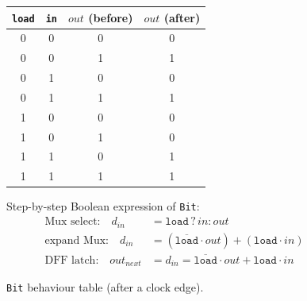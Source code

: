 \documentclass[11pt]{article}
\begin{document}
\begin{figure}[H]
  \centering
  \begin{minipage}[t]{0.46\linewidth}
    \centering
    \small
    \begin{tabular}[t]{@{}cc c c@{}}
    \toprule
    \texttt{load} & \texttt{in} & $out$ (before) & $out$ (after) \\
    \midrule
    0 & 0 & 0 & 0 \\
    0 & 0 & 1 & 1 \\
    0 & 1 & 0 & 0 \\
    0 & 1 & 1 & 1 \\
    1 & 0 & 0 & 0 \\
    1 & 0 & 1 & 0 \\
    1 & 1 & 0 & 1 \\
    1 & 1 & 1 & 1 \\
    \bottomrule
    \end{tabular}
    \caption{\texttt{Bit} behaviour table (after a clock edge).}
    \label{fig:lab3-bit-tt}
  \end{minipage}\hfill
  \begin{minipage}[t]{0.5\linewidth}
    \small
    Step-by-step Boolean expression of \texttt{Bit}:
    \begin{align}
      \text{Mux select:}\quad d_{in} &= \texttt{load}\,?\,in : out \nonumber\\
      \text{expand Mux:}\quad d_{in} &= (\overline{\texttt{load}}\cdot out) + (\texttt{load}\cdot in) \nonumber\\
      \text{DFF latch:}\quad out_{next} &= d_{in} = \overline{\texttt{load}}\cdot out + \texttt{load}\cdot in \nonumber
    \end{align}
  \end{minipage}
\end{figure}
\end{document}
